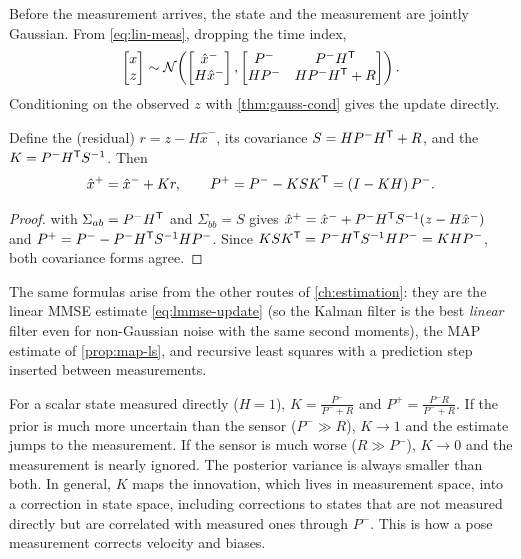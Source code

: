 Before the measurement arrives, the state and the measurement are jointly Gaussian. From \eqref{eq:lin-meas}, dropping the time index,
\begin{equation}
  \begin{bmatrix} x \\ z \end{bmatrix} \sim \mathcal{N}\!\left(
    \begin{bmatrix} \hat x^- \\ H\hat x^- \end{bmatrix},
    \begin{bmatrix} P^- & P^-H^{\mathsf{T}} \\ HP^- & HP^-H^{\mathsf{T}} + R \end{bmatrix} \right).
\end{equation}
Conditioning on the observed $z$ with \cref{thm:gauss-cond} gives the update directly.

\begin{theorem}
\label{thm:kf-update}
Define the  (residual) $r = z - H\hat x^-$, its covariance $S = HP^-H^{\mathsf{T}} + R$, and the  $K = P^-H^{\mathsf{T}} S^{-1}$. Then
\begin{equation}
  \hat x^+ = \hat x^- + K r, \qquad P^+ = P^- - K S K^{\mathsf{T}} = (I - KH)\,P^- .
  \label{eq:kf-update}
\end{equation}
\end{theorem}
\begin{proof}
 with $\Sigma_{ab} = P^-H^{\mathsf{T}}$ and $\Sigma_{bb} = S$ gives $\hat x^+ = \hat x^- + P^-H^{\mathsf{T}} S^{-1}(z - H\hat x^-)$ and $P^+ = P^- - P^-H^{\mathsf{T}} S^{-1} HP^-$. Since
$KSK^{\mathsf{T}} = P^-H^{\mathsf{T}} S^{-1} HP^- = KHP^-$, both covariance forms agree.
\end{proof}

The same formulas arise from the other routes of \cref{ch:estimation}: they are the linear MMSE estimate \eqref{eq:lmmse-update} (so the Kalman filter is the
best \emph{linear} filter even for non-Gaussian noise with the same second moments), the MAP estimate of \cref{prop:map-ls}, and recursive least squares
with a prediction step inserted between measurements.

\begin{keyidea}
For a scalar state measured directly ($H = 1$), $K = \frac{P^-}{P^- + R}$ and $P^+ = \frac{P^- R}{P^- + R}$. If the prior is much more uncertain than the
sensor ($P^- \gg R$), $K \to 1$ and the estimate jumps to the measurement. If the sensor is much worse ($R \gg P^-$), $K \to 0$ and the measurement is
nearly ignored. The posterior variance is always smaller than both. In general, $K$ maps the innovation, which lives in measurement space, into a
correction in state space, including corrections to states that are not measured directly but are correlated with measured ones through
$P^-$. This is how a pose measurement corrects velocity and biases.
\end{keyidea}

